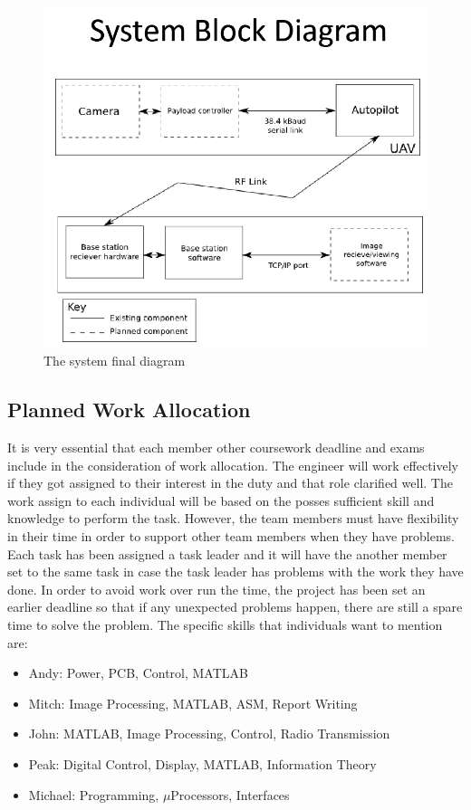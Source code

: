 \documentclass[oneside]{ecsgdp}         %
\begin{document}
\begin{figure}[!hbtp]
\begin{center}
\includegraphics[scale=0.6]{SystemBlockDiagram.PNG} 
\caption{The system final diagram\label{systemBlocD}}
\end{center}
\end{figure}


\subsection{Planned Work Allocation}
 It is very essential that each member other coursework deadline and exams include in the consideration of work allocation. 
The engineer will work effectively if they got assigned  to their interest in the duty and that role clarified well. The work assign to each individual will be based on the posses sufficient skill and knowledge to perform the task. However, the team members must have flexibility in their time in order to support other team members when they have problems. Each task has been assigned a task leader and it will have the another member set to the same task in case the task leader has problems with the work they have done. In order to avoid work over run the time, the project has been set an earlier deadline so that if any unexpected problems happen, there are still a spare time to solve the problem. The specific skills that individuals want to mention are:

\begin{itemize}
\item Andy: Power, PCB, Control, MATLAB
\item Mitch: Image Processing, MATLAB, ASM, Report Writing
\item John: MATLAB, Image Processing, Control, Radio Transmission
\item Peak: Digital Control, Display, MATLAB, Information Theory
\item Michael: Programming, $\mu$Processors, Interfaces
\end{itemize}
\end{document}
